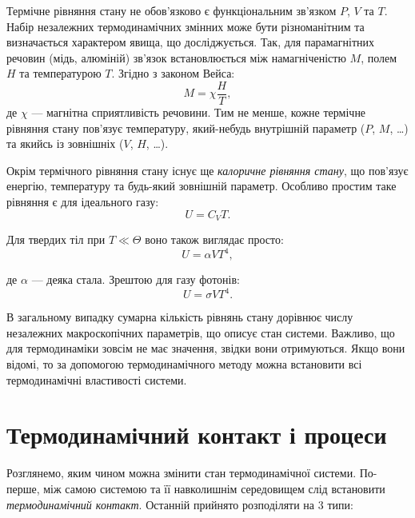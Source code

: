 Термічне рівняння стану не обов'язково є функціональним зв'язком $P$, $V$ та $T$. Набір незалежних
термодинамічних змінних може бути різноманітним та визначається характером явища, що досліджується.
Так, для парамагнітних речовин (мідь, алюміній) зв'язок встановлюється між намагніченістю $M$,
полем
$H$ та температурою $T$. Згідно з законом Вейса:
\begin{equation}
	M = \chi \frac{H}{T},
\end{equation}
де $\chi$ --- магнітна сприятливість речовини. Тим не менше, кожне термічне рівняння стану пов’язує
температуру, який-небудь внутрішній параметр ($P$, $M$, \ldots) та якийсь із зовнішніх ($V$, $H$,
\ldots).

Окрім термічного рівняння стану існує ще \textit{калоричне рівняння стану}, що пов'язує енергію,
температуру та будь-який зовнішній параметр. Особливо простим таке рівняння є для ідеального газу:
\begin{equation}
	U = C_V T.
\end{equation}

Для твердих тіл при $T \ll \Theta$ воно також виглядає просто:
\begin{equation*}
	U = \alpha V T^4,
\end{equation*}

де $\alpha$ --- деяка стала.  Зрештою для газу фотонів:
\begin{equation*}
	U = \sigma V T^4.
\end{equation*}

В загальному випадку сумарна кількість рівнянь стану дорівнює числу незалежних макроскопічних
параметрів, що описує стан системи. Важливо, що для термодинаміки зовсім не має значення, звідки
вони
отримуються. Якщо вони відомі, то за допомогою термодинамічного методу можна встановити всі
термодинамічні властивості системи.

\section{Термодинамічний контакт і процеси}

Розглянемо, яким чином можна змінити стан термодинамічної системи. По-перше, між самою системою
та її
навколишнім середовищем слід встановити \emph{термодинамічний контакт}. Останній прийнято розподіляти
на $3$ типи:

